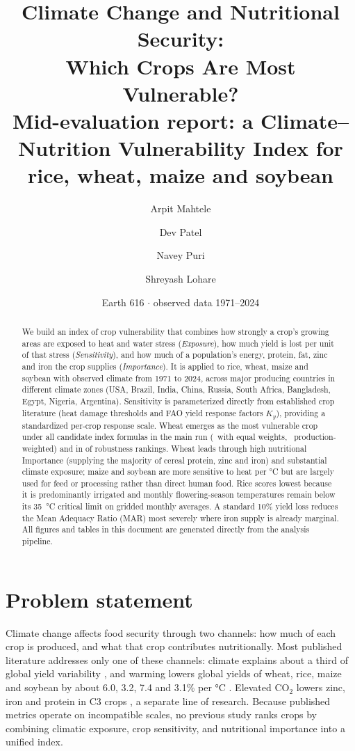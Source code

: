 \documentclass[11pt,a4paper]{article}
\title{\textbf{Climate Change and Nutritional Security:\\ Which Crops Are Most Vulnerable?}\\[0.4em]
\large Mid-evaluation report: a Climate--Nutrition Vulnerability Index for rice, wheat, maize and soybean}
\author{Arpit Mahtele \and Dev Patel \and Navey Puri \and Shreyash Lohare}
\date{Earth 616 \quad $\cdot$ \quad observed data 1971--2024}
\let\parencite\citep
\begin{document}
\maketitle

\begin{abstract}\small
We build an index of crop vulnerability that combines how strongly a crop's growing areas are exposed to heat and water stress (\emph{Exposure}), how much yield is lost per unit of that stress (\emph{Sensitivity}), and how much of a population's energy, protein, fat, zinc and iron the crop supplies (\emph{Importance}). It is applied to rice, wheat, maize and soybean with observed climate from 1971 to 2024, across major producing countries in different climate zones (USA, Brazil, India, China, Russia, South Africa, Bangladesh, Egypt, Nigeria, Argentina). Sensitivity is parameterized directly from established crop literature (heat damage thresholds and FAO yield response factors $K_y$), providing a standardized per-crop response scale. Wheat emerges as the most vulnerable crop under all candidate index formulas in the main run (\orderFour\ with equal weights, \orderFourPw\ production-weighted) and in \robWheatTopAll{} of \robN{} robustness rankings. Wheat leads through high nutritional Importance (supplying the majority of cereal protein, zinc and iron) and substantial climate exposure; maize and soybean are more sensitive to heat per \si{\celsius} but are largely used for feed or processing rather than direct human food. Rice scores lowest because it is predominantly irrigated and monthly flowering-season temperatures remain below its \SI{35}{\celsius} critical limit on gridded monthly averages. A standard 10\% yield loss reduces the Mean Adequacy Ratio (MAR) most severely where iron supply is already marginal. All figures and tables in this document are generated directly from the analysis pipeline.
\end{abstract}

\tableofcontents
\newpage

\section{Problem statement}
Climate change affects food security through two channels: how much of each crop is produced, and what that crop contributes nutritionally. Most published literature addresses only one of these channels: climate explains about a third of global yield variability \parencite{ray2015}, and warming lowers global yields of wheat, rice, maize and soybean by about 6.0, 3.2, 7.4 and 3.1\% per \si{\celsius} \parencite{zhao2017}. Elevated CO$_2$ lowers zinc, iron and protein in C3 crops \parencite{myers2014,smith2018}, a separate line of research. Because published metrics operate on incompatible scales, no previous study ranks crops by combining climatic exposure, crop sensitivity, and nutritional importance into a unified index.
\end{document}
